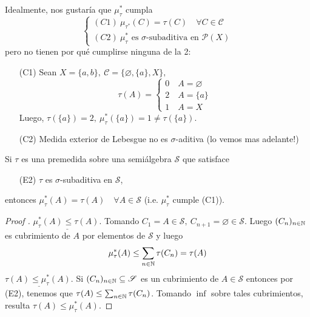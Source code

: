 \noindent Idealmente, nos gustaría que $\mu_{\tau}^{*}$ cumpla
\[ \begin{cases}
	(C1) \ \mu_{\tau^{*}}(C) = \tau(C) \quad \forall C \in \mathscr{C} \\
	(C2) \ \mu_{\tau}^{*} \text{ es } \sigma\text{-subaditiva en } \mathscr{P}(X)
\end{cases} \]
pero no tienen por qué cumplirse ninguna de la 2:
\begin{enumerate}
	\item[(C1)] Sean $X = \{a,b\},\ \mathscr{C} = \{\varnothing, \{a\}, X\}, $
	\[\tau(A) = \begin{cases}
		0 \quad A = \varnothing \\
		2 \quad A = \{a\} \\
		1 \quad A = X
	\end{cases} \] 
	Luego, $\tau(\{a\}) = 2,\ \mu_{\tau}^{*}(\{a\}) = 1 \neq \tau(\{a\})$.

	\item[(C2)] Medida exterior de Lebesgue no es $\sigma$-aditiva (lo vemos mas adelante!)
\end{enumerate}

\begin{prop}
	Si $\tau$ es una premedida sobre una semiálgebra $\mathscr{S}$ que satisface
	\begin{enumerate}
		\item[(E2)] $\tau$ es $\sigma$-subaditiva en $\mathscr{S}$,
	\end{enumerate}
	entonces $\mu_{\tau}^{*}(A) = \tau(A)\quad \forall A \in \mathscr{S}$ (i.e. $\mu_{\tau}^{*}$ cumple (C1)).
\end{prop}
\begin{proof}[Proof ]
	$\underline{\mu_{\tau}^{*}(A) \leq \tau(A).}$ Tomando $C_1 = A \in \mathscr{S},\ C_{n+1} = \varnothing \in \mathscr{S}$. Luego $(C_n)_{n\in\mathbb{N}}$ es cubrimiento de $A$ por elementos de $\mathscr{S}$ y luego
	\[ \mu_{\tau}^{*}(A) \leq \sum_{n\in\mathbb{N}} \tau(C_n) = \tau(A) \]
	$\underline{\tau(A) \leq \mu_{\tau}^{*}(A).}$ Si $(C_n)_{n\in\mathbb{N}}\subseteq \mathscr{S}$ es un cubrimiento de $A \in \mathscr{S}$ entonces por (E2), tenemos que $\tau(A) \leq \sum_{n\in\mathbb{N}} \tau(C_n)$. Tomando $\inf$ sobre tales cubrimientos, resulta $\tau(A) \leq \mu_{\tau}^{*}(A)$.
\end{proof}

